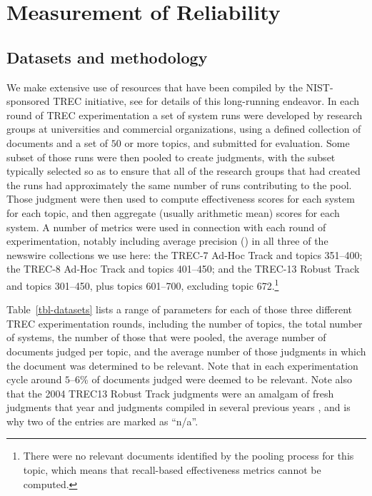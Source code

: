 \section{Measurement of Reliability}
\label{sec-measurement}

\subsection{Datasets and methodology}

We make extensive use of resources that have been compiled by the
NIST-sponsored TREC initiative, see {\citet{vh05trecbook}} for
details of this long-running endeavor.
In each round of TREC experimentation a set of system runs were
developed by research groups at universities and commercial
organizations, using a defined collection of documents and a set of
$50$ or more topics, and submitted for evaluation.
Some subset of those runs were then pooled to create judgments, with
the subset typically selected so as to ensure that all of the
research groups that had created the runs had approximately the same
number of runs contributing to the pool.
Those judgment were then used to compute effectiveness scores for
each system for each topic, and then aggregate (usually arithmetic
mean) scores for each system.
A number of metrics were used in connection with each round of
experimentation, notably including average precision (\ap) in all
three of the newswire collections we use here: the TREC-7 Ad-Hoc
Track and topics 351--400; the TREC-8 Ad-Hoc Track and topics
401--450; and the TREC-13 Robust Track and topics 301--450, plus
topics 601--700, excluding topic 672.\footnote{There were no relevant
documents identified by the pooling process for this topic, which
means that recall-based effectiveness metrics cannot be computed.}

Table~\ref{tbl-datasets} lists a range of parameters for each of
those three different TREC experimentation rounds, including the
number of topics, the total number of systems, the number of those
that were pooled, the average number of documents judged per topic,
and the average number of those judgments in which the document was
determined to be relevant.
Note that in each experimentation cycle around $5$--$6$\% of
documents judged were deemed to be relevant.
Note also that the 2004 TREC13 Robust Track judgments were an amalgam
of fresh judgments that year and judgments compiled in several
previous years {\citep{voorhees04trec,voorhees04trecrobust}}, and is
why two of the entries are marked as ``n/a''.

